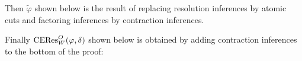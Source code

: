 \documentclass{llncs}
\begin{document}
\begin{example}
Then $\tilde{\varphi}$ shown below is the result of replacing resolution inferences by atomic cuts and factoring inferences by contraction inferences.

\begin{scriptsize}
\begin{prooftree}
 
 
		 
				 
				 
						 
									 
								 
						 
		 
				 
\end{prooftree}
\end{scriptsize}

Finally $\CEResNFSwapO{\varphi}{\delta}$ shown below is obtained by adding contraction inferences to the bottom of the proof:


\end{example}
\end{document}
